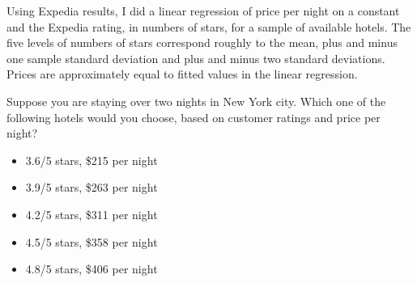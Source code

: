 Using Expedia results, I did a linear regression of price per night on a constant and the Expedia rating, in numbers of stars, for a sample of available hotels.
The five levels of numbers of stars correspond roughly to the mean, plus and minus one sample standard deviation and plus and minus two standard deviations.
Prices are approximately equal to fitted values in the linear regression.

\begin{tcolorbox}
Suppose you are staying over two nights in New York city.
Which one of the following hotels would you choose, based on customer ratings and price per night?	

\begin{itemize}
	\setlength\itemsep{-5pt}
	\item 3.6/5 stars, \$215 per night
	\item 3.9/5 stars, \$263 per night
	\item 4.2/5 stars, \$311 per night
	\item 4.5/5 stars, \$358 per night
	\item 4.8/5 stars, \$406 per night
\end{itemize}
\end{tcolorbox}

